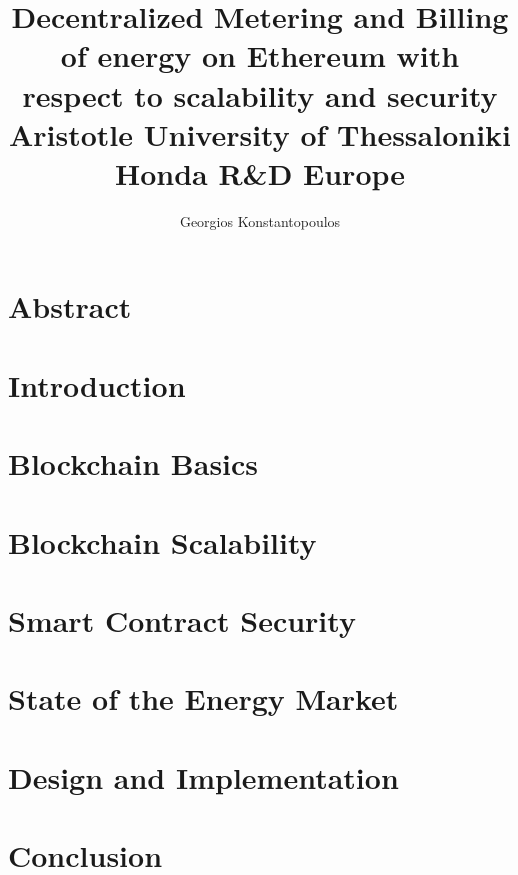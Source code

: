 \documentclass[12pt,twoside]{report}
\title{
	{Decentralized Metering and Billing of energy on Ethereum with respect to scalability and security}\\
	{Aristotle University of Thessaloniki}\\
	{\large Honda R\&D Europe}\\
}
\author{Georgios Konstantopoulos}
\date{}
\begin{document}
\maketitle
\tableofcontents

\chapter{Abstract}




\chapter{Introduction}


\chapter{Blockchain Basics}


\chapter{Blockchain Scalability}


\chapter{Smart Contract Security}


\chapter{State of the Energy Market}


\chapter{Design and Implementation}


\chapter{Conclusion}

\end{document}
